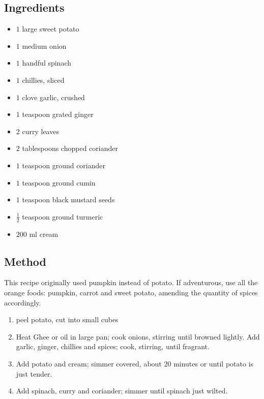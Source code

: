 \documentclass[11pt,a4paper]{article}
\begin{document}
\subsection*{Ingredients}

\begin{multicols}{2}

\begin{itemize}
  \item $ 1 $ large sweet potato
  \item $ 1 $ medium onion
  \item $ 1 $ handful spinach
  \item $ 1 $ chillies, sliced
  \item $ 1 $ clove garlic, crushed
  \item $ 1 $ teaspoon grated ginger
  \item $ 2 $ curry leaves
  \item $ 2 $ tablespoons chopped coriander
\end{itemize}

\columnbreak

\begin{itemize}
  \item $ 1 $ teaspoon ground coriander
  \item $ 1 $ teaspoon ground cumin
  \item $ 1 $ teaspoon black mustard seeds
  \item $ \frac {1} {2} $ teaspoon ground turmeric
  \item $ 200 $ \si{\milli\litre} cream  
\end{itemize}

\end{multicols}

\medskip

\subsection*{Method}

This recipe originally used pumpkin instead of potato. If adventurous, use all
the orange foods: pumpkin, carrot and sweet potato, amending the quantity of
spices accordingly.

\begin{enumerate}
   \item peel potato, cut into small cubes
   \item Heat Ghee or oil in large pan; cook onions, stirring until browned
     lightly. Add garlic, ginger, chillies and spices; cook, stirring, until
     fragrant.
   \item Add potato and cream; simmer covered, about 20 minutes or until potato
     is just tender.
   \item Add spinach, curry and coriander; simmer until spinach just wilted.
\end{enumerate}
\end{document}
